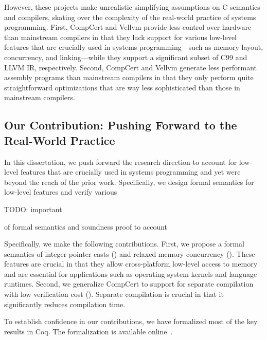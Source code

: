 
However, these projects make unrealistic simplifying assumptions on C semantics and compilers,
skating over the complexity of the real-world practice of systems programming.  First, CompCert and
Vellvm provide less control over hardware than mainstream compilers in that they lack support for
various low-level features that are crucially used in systems programming---such as memory layout,
concurrency, and linking---while they support a significant subset of C99 and LLVM IR, respectively.
Second, CompCert and Vellvm generate less performant assembly programs than mainstream compilers in
that they only perform quite straightforward optimizations that are way less sophisticated than
those in mainstream compilers.



\subsection{Our Contribution: Pushing Forward to the Real-World Practice}

In this dissertation, we push forward the research direction to account for low-level features that
are crucially used in systems programming and yet were beyond the reach of the prior work.
Specifically, we design formal semantics for low-level features and verify various

TODO: important

of formal semantics and soundness proof to account 

Specifically, we make the following contributions.  First, we propose a formal semantics of
integer-pointer casts () and relaxed-memory concurrency ().
These features are crucial in that they allow cross-platform low-level access to memory and are
essential for applications such as operating system kernels and language runtimes.  Second, we
generalize CompCert to support for separate compilation with low verification cost
().  Separate compilation is crucial in that it significantly reduces compilation
time.

To establish confidence in our contributions, we have formalized most of the key results in Coq.
The formalization is available online~\cite{kang-phd-thesis-web}.

